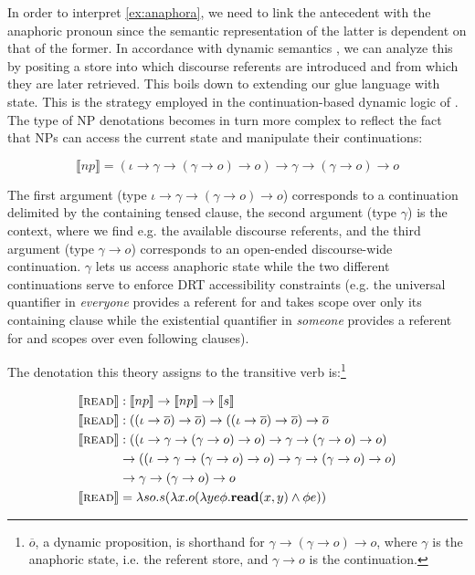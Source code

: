 \documentclass{article}
\newcommand{\sem}[1]{\llbracket #1 \rrbracket}
\begin{document}
In order to interpret \eqref{ex:anaphora}, we need to link the antecedent with
the anaphoric pronoun since the semantic representation of the latter is
dependent on that of the former. In accordance with dynamic semantics
\citep{kamp1993discourse}, we can analyze this by positing a store into which
discourse referents are introduced and from which they are later
retrieved. This boils down to extending our glue language with state. This is
the strategy employed in the continuation-based dynamic logic of
\citet{de2006towards}. The type of NP denotations becomes in turn more complex
to reflect the fact that NPs can access the current state and manipulate their
continuations:

\vspace{-1mm}

$$
\sem{np} = (\iota \to \gamma \to (\gamma \to o) \to o) \to \gamma \to (\gamma
\to o) \to o
$$

The first argument (type $\iota \to \gamma \to (\gamma \to o) \to o$)
corresponds to a continuation delimited by the containing tensed clause, the
second argument (type $\gamma$) is the context, where we find e.g. the
available discourse referents, and the third argument (type $\gamma \to o$)
corresponds to an open-ended discourse-wide continuation. $\gamma$ lets us
access anaphoric state while the two different continuations serve to enforce
DRT accessibility constraints \citep{kamp1993discourse} (e.g. the universal
quantifier in \emph{everyone} provides a referent for and takes scope over
only its containing clause while the existential quantifier in \emph{someone}
provides a referent for and scopes over even following clauses).

The denotation this theory assigns to the transitive verb
is:\footnote{$\overline{o}$, a dynamic proposition, is shorthand for $\gamma
  \to (\gamma \to o) \to o$, where $\gamma$ is the anaphoric state, i.e. the
  referent store, and $\gamma \to o$ is the continuation.}

\begin{align*}
  \sem{\textsc{read}} & : \sem{np} \to \sem{np} \to \sem{s} \\
  \sem{\textsc{read}} & : ((\iota \to \overline{o}) \to \overline{o}) \to
                          ((\iota \to \overline{o}) \to \overline{o}) \to
                          \overline{o} \\
  \sem{\textsc{read}} & : ((\iota \to \gamma \to (\gamma \to o) \to o)
                           \to \gamma \to (\gamma \to o) \to o) \\ & \to
                          ((\iota \to \gamma \to (\gamma \to o) \to o)
                           \to \gamma \to (\gamma \to o) \to o) \\ & \to
                           \gamma \to (\gamma \to o) \to o \\
  \sem{\textsc{read}} & = \lambda s o. s (\lambda x. o (\lambda y e
  \phi. \textbf{read}(x, y) \land \phi e))
\end{align*}
\end{document}
